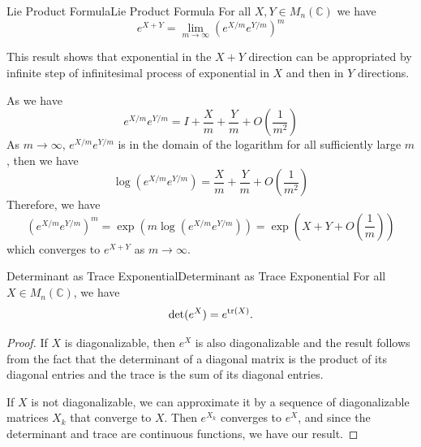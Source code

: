 \documentclass[../main.tex]{subfiles}
\begin{document}
\begin{theorem}{Lie Product Formula}{Lie Product Formula}
  For all $X, Y\in M_n(\mathbb{C})$ we have
  \begin{equation}
    e^{X + Y} = \lim_{m \to \infty} \left(e^{X / m}e^{Y / m}\right)^m
  \end{equation}
\end{theorem}
\begin{remark}
  This result shows that exponential in the $X+Y$ direction can be appropriated by infinite step of infinitesimal process of exponential in $X$ and then in $Y$ directions.

  As we have
  \begin{equation}
    e^{X/m}e^{Y/m} = I + \frac{X}{m} + \frac{Y}{m} + O\left(\frac{1}{m^2}\right)
  \end{equation}
  As $m \to \infty$, $e^{X/m}e^{Y/m}$ is in the domain of the logarithm for all sufficiently large $m$, then we have
  \begin{equation}
    \log\left(e^{X/m}e^{Y/m}\right) = \frac{X}{m} + \frac{Y}{m} + O\left(\frac{1}{m^2}\right)
  \end{equation}
  Therefore, we have
  \begin{equation*}
    \left(e^{X/m}e^{Y/m}\right)^m = \exp\left(m \log\left(e^{X/m}e^{Y/m}\right)\right) = \exp\left(X + Y + O\left(\frac{1}{m}\right)\right)
  \end{equation*}
  which converges to $e^{X + Y}$ as $m \to \infty$.
\end{remark}

\begin{theorem}{Determinant as Trace Exponential}{Determinant as Trace Exponential}
  For all $X \in M_n(\mathbb{C})$, we have
  \begin{equation}
    \det(e^X) = e^{\operatorname{tr}(X)}.
  \end{equation}
\end{theorem}
\begin{proof}
  If $X$ is diagonalizable, then $e^X$ is also diagonalizable and the result follows from the fact that the determinant of a diagonal matrix is the product of its diagonal entries and the trace is the sum of its diagonal entries.

  If $X$ is not diagonalizable, we can approximate it by a sequence of diagonalizable matrices $X_k$ that converge to $X$. Then $e^{X_k}$ converges to $e^X$, and since the determinant and trace are continuous functions, we have our result.
\end{proof}
\end{document}
